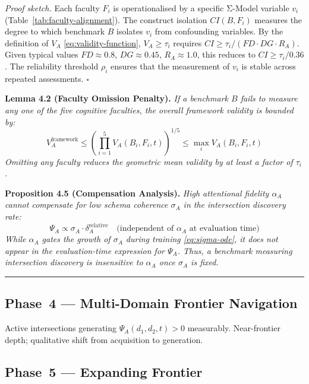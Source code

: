 \documentclass[11pt,a4paper]{article}
\begin{document}
\textit{Proof sketch.} Each faculty $F_i$ is operationalised by a specific
Σ-Model variable $v_i$ (Table~\ref{tab:faculty-alignment}). The construct isolation $CI(B, F_i)$
measures the degree to which benchmark $B$ isolates $v_i$ from confounding
variables. By the definition of $V_A$ \eqref{eq:validity-function},
$V_A \geq \tau_i$ requires $CI \geq \tau_i / (FD \cdot DG \cdot R_A)$.
Given typical values $FD \approx 0.8$, $DG \approx 0.45$, $R_A \approx 1.0$,
this reduces to $CI \geq \tau_i / 0.36$. The reliability threshold $\rho_i$
ensures that the measurement of $v_i$ is stable across repeated assessments.
$\square$

\textbf{Lemma 4.2 (Faculty Omission Penalty).}
\textit{If a benchmark $B$ fails to measure any one of the five cognitive
faculties, the overall framework validity is bounded by:
\begin{equation}\label{eq:omission-penalty}
V_A^{\text{framework}} \leq \left(\prod_{i=1}^{5} V_A(B_i, F_i, t)\right)^{1/5} \leq \max_i V_A(B_i, F_i, t)
\end{equation}
Omitting any faculty reduces the geometric mean validity by at least a
factor of $\tau_i$.}

\textbf{Proposition 4.5 (Compensation Analysis).}
\textit{High attentional fidelity $\alpha_A$ cannot compensate for low
schema coherence $\sigma_A$ in the intersection discovery rate:
\begin{equation}\label{eq:no-compensation}
\Psi_A \propto \sigma_A \cdot \delta_A^{\text{relative}} \quad \text{(independent of } \alpha_A \text{ at evaluation time)}
\end{equation}
While $\alpha_A$ gates the \textit{growth} of $\sigma_A$ during training
\eqref{eq:sigma-ode}, it does not appear in the evaluation-time
expression for $\Psi_A$. Thus, a benchmark measuring intersection discovery
is insensitive to $\alpha_A$ once $\sigma_A$ is fixed.}

\noindent\rule{\linewidth}{0.4pt}

\subsection*{Phase~4 --- Multi-Domain Frontier Navigation}

Active intersections generating $\Psi_A(d_1,d_2,t) > 0$ measurably.
Near-frontier depth; qualitative shift from acquisition to generation.

\subsection*{Phase~5 --- Expanding Frontier}
\end{document}
